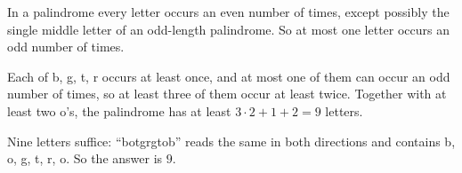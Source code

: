 In a palindrome every letter occurs an even number of times, except possibly the single middle letter of an odd-length palindrome. So at most one letter occurs an odd number of times.

Each of b, g, t, r occurs at least once, and at most one of them can occur an odd number of times, so at least three of them occur at least twice. Together with at least two o's, the palindrome has at least $3\cdot2+1+2=9$ letters.

Nine letters suffice: ``botgrgtob'' reads the same in both directions and contains b, o, g, t, r, o. So the answer is $\boxed{9}$.
